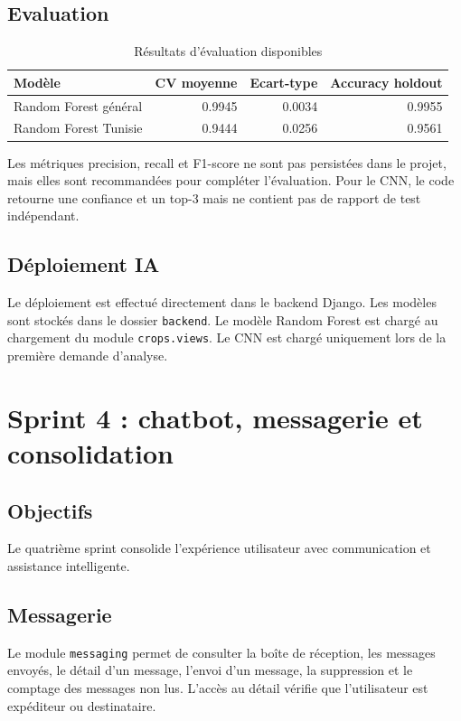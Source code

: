 \subsection{Evaluation}
\begin{table}[H]
\centering
\caption{Résultats d'évaluation disponibles}
\begin{tabular}{lrrr}
\toprule
\textbf{Modèle} & \textbf{CV moyenne} & \textbf{Ecart-type} & \textbf{Accuracy holdout} \\
\midrule
Random Forest général & 0.9945 & 0.0034 & 0.9955 \\
Random Forest Tunisie & 0.9444 & 0.0256 & 0.9561 \\
\bottomrule
\end{tabular}
\end{table}

Les métriques precision, recall et F1-score ne sont pas persistées dans le projet, mais elles sont recommandées pour compléter l'évaluation. Pour le CNN, le code retourne une confiance et un top-3 mais ne contient pas de rapport de test indépendant.

\subsection{Déploiement IA}
Le déploiement est effectué directement dans le backend Django. Les modèles sont stockés dans le dossier \texttt{backend}. Le modèle Random Forest est chargé au chargement du module \texttt{crops.views}. Le CNN est chargé uniquement lors de la première demande d'analyse.

\section{Sprint 4 : chatbot, messagerie et consolidation}
\subsection{Objectifs}
Le quatrième sprint consolide l'expérience utilisateur avec communication et assistance intelligente.

\subsection{Messagerie}
Le module \texttt{messaging} permet de consulter la boîte de réception, les messages envoyés, le détail d'un message, l'envoi d'un message, la suppression et le comptage des messages non lus. L'accès au détail vérifie que l'utilisateur est expéditeur ou destinataire.

